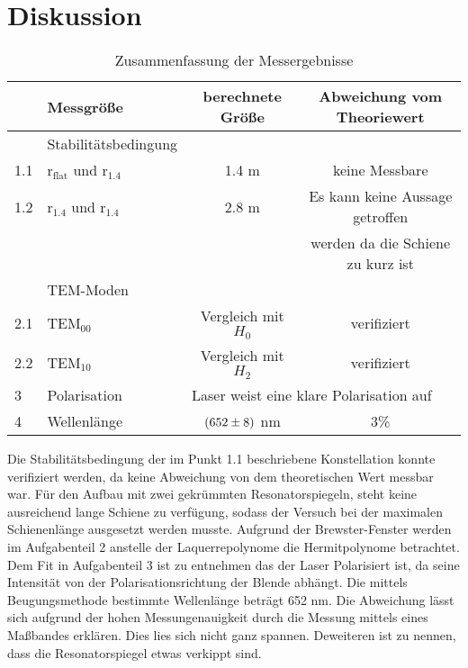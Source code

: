 \section{Diskussion}
\label{sec:Diskussion}

\begin{table}
  \centering
  \begin{tabular}{l|l | c c}
    \toprule
	&Messgröße	& berechnete Größe	& Abweichung vom Theoriewert \\
    \midrule
	& Stabilitätsbedingung \\
	1.1& \rightarrow $\text{r}_\text{flat}$ und $\text{r}_\text{1.4}$ & 1.4 m & keine Messbare\\
	1.2& \rightarrow $\text{r}_\text{1.4}$ und $\text{r}_\text{1.4}$ & 2.8 m& Es kann keine Aussage getroffen \\
	& & &werden da die Schiene zu kurz ist \\
	& TEM-Moden\\
	2.1& \rightarrow TEM$_{00}$ & Vergleich mit $H_0$ & verifiziert \\
	2.2& \rightarrow TEM$_{10}$ & Vergleich mit $H_2$ & verifiziert \\
	3& Polarisation& \multicolumn{2}{l}{Laser weist eine klare Polarisation auf} \\
	4& Wellenlänge & $(\num{652 +-8})$ nm & 3\% \\
    \bottomrule
  \end{tabular}
  \caption{Zusammenfassung der Messergebnisse}
  \label{tab:Mess}
\end{table}

Die Stabilitätsbedingung der im Punkt 1.1 beschriebene Konstellation konnte verifiziert werden, da keine Abweichung von dem theoretischen Wert messbar war. Für den Aufbau mit zwei gekrümmten Resonatorspiegeln, steht keine ausreichend lange Schiene zu verfügung, sodass der Versuch bei der maximalen Schienenlänge ausgesetzt werden musste. Aufgrund der Brewster-Fenster werden im Aufgabenteil 2 anstelle der Laquerrepolynome die Hermitpolynome betrachtet. Dem Fit in Aufgabenteil 3 ist zu entnehmen das der Laser Polarisiert ist, da seine Intensität von der Polarisationsrichtung der Blende abhängt. Die mittels Beugungsmethode bestimmte Wellenlänge beträgt 652 nm. Die Abweichung lässt sich aufgrund der hohen Messungenauigkeit durch die Messung mittels eines Maßbandes erklären. Dies lies sich nicht ganz spannen. Deweiteren ist zu nennen, dass die Resonatorspiegel etwas verkippt sind.  
